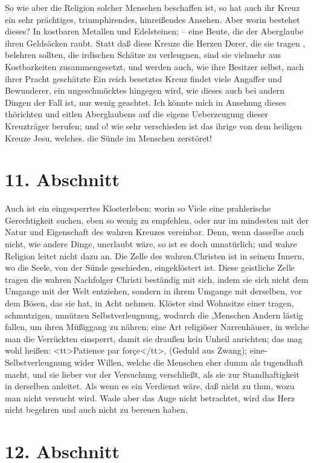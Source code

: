So wie aber die Religion solcher Menschen beschaffen ist, so hat auch ihr Kreuz ein sehr prächtiges, triumphirendes, hinreißendes Ansehen. Aber worin bestehet dieses? In kostbaren Metallen und Edelsteinen; – eine Beute, die der Aberglaube ihren Geldsäcken raubt. Statt daß diese Kreuze die Herzen Derer, die sie tragen , belehren sollten, die irdischen Schätze zu verleugnen, sind sie vielmehr aus Kostbarkeiten zusammengesetzt, und werden auch, wie ihre Besitzer selbst, nach ihrer Pracht geschätzte Ein reich besetztes Kreuz findet viele Angaffer und Bewunderer, ein ungeschmücktes hingegen wird, wie dieses auch bei andern Dingen der Fall ist, nur wenig geachtet. Ich könnte mich in Ansehung dieses thörichten und eitlen Aberglaubens auf die eigene Ueberzeugung dieser Kreuzträger berufen; und o! wie sehr verschieden ist das ihrige von dem heiligen Kreuze Jesu, welches. die Sünde im Menschen zerstöret!

\section{11. Abschnitt}

Auch ist ein eingesperrtes Klosterleben; worin so Viele eine prahlerische Gerechtigkeit suchen, eben so wenig zu empfehlen, oder nur im mindesten mit der Natur und Eigenschaft des wahren Kreuzes vereinbar. Denn, wenn dasselbe auch nicht, wie andere Dinge, unerlaubt wäre, so ist es doch unnatürlich; und wahre Religion leitet nicht dazu an. Die Zelle des wahren.Christen ist in seinem Innern, wo die Seele, von der Sünde geschieden, eingeklöstert ist. Diese geistliche Zelle tragen die wahren Nachfolger Christi beständig mit sich, indem sie sich nicht dem Umgange mit der Welt entziehen, sondern in ihrem Umgange mit derselben, vor dem Bösen, das sie hat, in Acht nehmen. Klöster sind Wohnsitze einer tragen, schmutzigen, unnützen Selbstverleugnung, wodurch die ,Menschen Andern lästig fallen, um ihren Müßiggang zu nähren; eine Art religiöser Narrenhäuser, in welche man die Verrückten einsperrt, damit sie draußen kein Unheil anrichten; das mag wohl heißen: <tt>Patience par forçe</tt>, (Geduld aus Zwang); eine- Selbstverleugnung wider  Willen, welche die Menschen eher dumm als tugendhaft macht, und sie lieber vor der Versuchung verschließt, als sie zur Standhaftigkeit in derselben anleitet. Als wenn es ein Verdienst wäre, daß nicht zu thun, wozu man nicht versucht wird. Wade aber das Auge nicht betrachtet, wird das Herz nicht begehren und auch nicht zu bereuen haben.

\section{12. Abschnitt}

